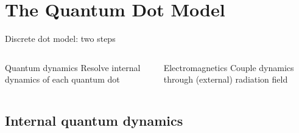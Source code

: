 \documentclass[aspectratio=169, usenames, dvipsnames]{beamer}
\begin{document}
\section{The Quantum Dot Model}

\begin{frame}{Discrete dot model: two steps}
  \begin{columns}
    \begin{column}{0.5\textwidth}
      \begin{block}{Quantum dynamics}
        Resolve internal dynamics of each quantum dot 
      \end{block}
    \end{column}

    \begin{column}{0.5\textwidth}
      \begin{block}{Electromagnetics}
        Couple dynamics through (external) radiation field 
      \end{block}
    \end{column}
  \end{columns}
\end{frame}

\subsection{Internal quantum dynamics}
\end{document}
